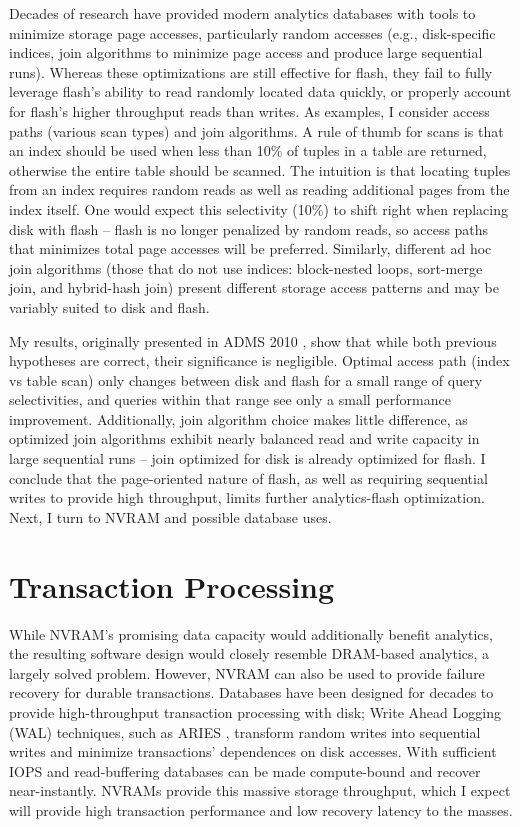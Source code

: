 Decades of research have provided modern analytics databases with tools to minimize storage page accesses, particularly random accesses (e.g., disk-specific indices, join algorithms to minimize page access and produce large sequential runs).
Whereas these optimizations are still effective for flash, they fail to fully leverage flash's ability to read randomly located data quickly, or properly account for flash's higher throughput reads than writes.
As examples, I consider access paths (various scan types) and join algorithms.
A rule of thumb for scans is that an index should be used when less than 10\% of tuples in a table are returned, otherwise the entire table should be scanned.
The intuition is that locating tuples from an index requires random reads as well as reading additional pages from the index itself.
One would expect this selectivity (10\%) to shift right when replacing disk with flash -- flash is no longer penalized by random reads, so access paths that minimizes total page accesses will be preferred.
Similarly, different ad hoc join algorithms (those that do not use indices: block-nested loops, sort-merge join, and hybrid-hash join) present different storage access patterns and may be variably suited to disk and flash.

My results, originally presented in ADMS 2010 \cite{PelleyWenisch11}, show that while both previous hypotheses are correct, their significance is negligible.
Optimal access path (index vs table scan) only changes between disk and flash for a small range of query selectivities, and queries within that range see only a small performance improvement.
Additionally, join algorithm choice makes little difference, as optimized join algorithms exhibit nearly balanced read and write capacity in large sequential runs -- join optimized for disk is already optimized for flash.
I conclude that the page-oriented nature of flash, as well as requiring sequential writes to provide high throughput, limits further analytics-flash optimization.
Next, I turn to NVRAM and possible database uses.

\section{Transaction Processing}
\label{sec:Intro:OLTP}

While NVRAM's promising data capacity would additionally benefit analytics, the resulting software design would closely resemble DRAM-based analytics, a largely solved problem.
However, NVRAM can also be used to provide failure recovery for durable transactions.
Databases have been designed for decades to provide high-throughput transaction processing with disk; Write Ahead Logging (WAL) techniques, such as ARIES \cite{MohanHaderle92}, transform random writes into sequential writes and minimize transactions' dependences on disk accesses.
With sufficient IOPS and read-buffering databases can be made compute-bound and recover near-instantly.
NVRAMs provide this massive storage throughput, which I expect will provide high transaction performance and low recovery latency to the masses.

